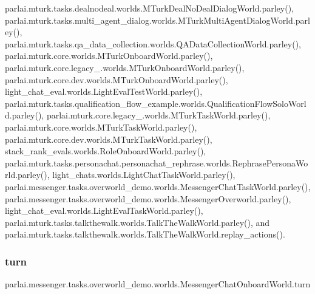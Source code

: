 parlai.\+mturk.\+tasks.\+dealnodeal.\+worlds.\+M\+Turk\+Deal\+No\+Deal\+Dialog\+World.\+parley(), parlai.\+mturk.\+tasks.\+multi\+\_\+agent\+\_\+dialog.\+worlds.\+M\+Turk\+Multi\+Agent\+Dialog\+World.\+parley(), parlai.\+mturk.\+tasks.\+qa\+\_\+data\+\_\+collection.\+worlds.\+Q\+A\+Data\+Collection\+World.\+parley(), parlai.\+mturk.\+core.\+worlds.\+M\+Turk\+Onboard\+World.\+parley(), parlai.\+mturk.\+core.\+legacy\+\_.\+worlds.\+M\+Turk\+Onboard\+World.\+parley(), parlai.\+mturk.\+core.\+dev.\+worlds.\+M\+Turk\+Onboard\+World.\+parley(), light\+\_\+chat\+\_\+eval.\+worlds.\+Light\+Eval\+Test\+World.\+parley(), parlai.\+mturk.\+tasks.\+qualification\+\_\+flow\+\_\+example.\+worlds.\+Qualification\+Flow\+Solo\+World.\+parley(), parlai.\+mturk.\+core.\+legacy\+\_.\+worlds.\+M\+Turk\+Task\+World.\+parley(), parlai.\+mturk.\+core.\+worlds.\+M\+Turk\+Task\+World.\+parley(), parlai.\+mturk.\+core.\+dev.\+worlds.\+M\+Turk\+Task\+World.\+parley(), stack\+\_\+rank\+\_\+evals.\+worlds.\+Role\+Onboard\+World.\+parley(), parlai.\+mturk.\+tasks.\+personachat.\+personachat\+\_\+rephrase.\+worlds.\+Rephrase\+Persona\+World.\+parley(), light\+\_\+chats.\+worlds.\+Light\+Chat\+Task\+World.\+parley(), parlai.\+messenger.\+tasks.\+overworld\+\_\+demo.\+worlds.\+Messenger\+Chat\+Task\+World.\+parley(), parlai.\+messenger.\+tasks.\+overworld\+\_\+demo.\+worlds.\+Messenger\+Overworld.\+parley(), light\+\_\+chat\+\_\+eval.\+worlds.\+Light\+Eval\+Task\+World.\+parley(), parlai.\+mturk.\+tasks.\+talkthewalk.\+worlds.\+Talk\+The\+Walk\+World.\+parley(), and parlai.\+mturk.\+tasks.\+talkthewalk.\+worlds.\+Talk\+The\+Walk\+World.\+replay\+\_\+actions().

\mbox{\label{classparlai_1_1messenger_1_1tasks_1_1overworld__demo_1_1worlds_1_1MessengerChatOnboardWorld_a1c12c2edab53bc4139fbd120b7ccfb29}} 
\subsubsection{\texorpdfstring{turn}{turn}}
{\footnotesize\ttfamily parlai.\+messenger.\+tasks.\+overworld\+\_\+demo.\+worlds.\+Messenger\+Chat\+Onboard\+World.\+turn}



